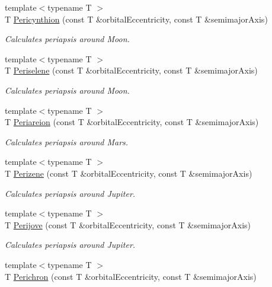 \begin{DoxyCompactItemize}
{\footnotesize template$<$typename T $>$ }\\T \mbox{\hyperlink{group___e_g_x_phys-_periapsis_gaeeba153b188cd06cbd233eaef12f0a6a}{Pericynthion}} (const T \&orbital\+Eccentricity, const T \&semimajor\+Axis)
\begin{DoxyCompactList}\small\item\em Calculates periapsis around Moon. \end{DoxyCompactList}\item 
{\footnotesize template$<$typename T $>$ }\\T \mbox{\hyperlink{group___e_g_x_phys-_periapsis_ga255874374dde571531e443cdbef9ef0c}{Periselene}} (const T \&orbital\+Eccentricity, const T \&semimajor\+Axis)
\begin{DoxyCompactList}\small\item\em Calculates periapsis around Moon. \end{DoxyCompactList}\item 
{\footnotesize template$<$typename T $>$ }\\T \mbox{\hyperlink{group___e_g_x_phys-_periapsis_ga0617ba07a30b0fd0544c02f691bfae26}{Periareion}} (const T \&orbital\+Eccentricity, const T \&semimajor\+Axis)
\begin{DoxyCompactList}\small\item\em Calculates periapsis around Mars. \end{DoxyCompactList}\item 
{\footnotesize template$<$typename T $>$ }\\T \mbox{\hyperlink{group___e_g_x_phys-_periapsis_ga0523c65b7fc26e675388b2c3d38aa00b}{Perizene}} (const T \&orbital\+Eccentricity, const T \&semimajor\+Axis)
\begin{DoxyCompactList}\small\item\em Calculates periapsis around Jupiter. \end{DoxyCompactList}\item 
{\footnotesize template$<$typename T $>$ }\\T \mbox{\hyperlink{group___e_g_x_phys-_periapsis_ga075052f7ff9aa1d5fdf4501b493be86b}{Perijove}} (const T \&orbital\+Eccentricity, const T \&semimajor\+Axis)
\begin{DoxyCompactList}\small\item\em Calculates periapsis around Jupiter. \end{DoxyCompactList}\item 
{\footnotesize template$<$typename T $>$ }\\T \mbox{\hyperlink{group___e_g_x_phys-_periapsis_ga12b5e99aa2e3e7031ef6ce93060cf516}{Perichron}} (const T \&orbital\+Eccentricity, const T \&semimajor\+Axis)

\end{DoxyCompactItemize}
